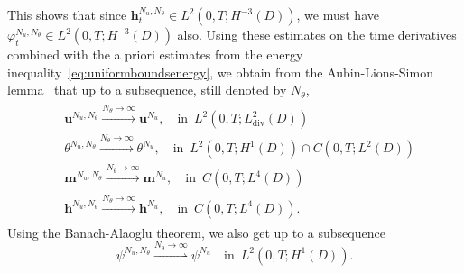 \documentclass[10pt,letterpaper,twoside]{amsart}
\theoremstyle{definition}{\newtheorem{definition}[lemma]{Definition}}
\theoremstyle{note}{\newtheorem{claim}{Claim}[section]
\newtheorem*{claim*}{Claim}}
\numberwithin{equation}{section}
\newcommand{\dom}{D}
\newcommand{\weak}{\rightharpoonup}
\newcommand{\bu}{\mathbf{u}}
\newcommand{\bm}{\mathbf{m}}
\newcommand{\bhb}{\mathbf{h}^{N_u,N_\theta}}
\newcommand{\phb}{\varphi^{N_u,N_\theta}}
\newcommand{\bh}{\mathbf{h}}
\begin{document}
  This shows that since $\bhb_t\in L^2(0,T;H^{-3}(\dom))$, we must have $\phb_t\in L^2(0,T;H^{-3}(\dom))$ also.
 Using these estimates on the time derivatives combined with the a priori estimates from the energy inequality~\eqref{eq:uniformboundsenergy}, we obtain from the Aubin-Lions-Simon lemma~\cite{Simon1987} that up to a subsequence, still denoted by $N_\theta$,
 \begin{align}
 \label{eq:Nu-conv}
 \begin{aligned}
 	&\bu^{N_u,N_\theta}\stackrel{N_\theta\to\infty}{\longrightarrow} \bu^{N_u},\quad \text{in }\, L^2(0,T;L^2_{\text{div}}(\dom))\\
 	& \theta^{N_u,N_\theta}\stackrel{N_\theta\to\infty}{\longrightarrow} \theta^{N_u},\quad \text{in }\, L^2(0,T;H^1(\dom))\cap C(0,T;L^2(\dom))\\
 		&\bm^{N_u,N_\theta}\stackrel{N_\theta\to\infty}{\longrightarrow} \bm^{N_u},\quad \text{in }\, C(0,T;L^4(\dom))\\
 		&\bh^{N_u,N_\theta}\stackrel{N_\theta\to\infty}{\longrightarrow} \bh^{N_u},\quad \text{in }\, C(0,T;L^4(\dom)).
 \end{aligned}
 \end{align}
 Using the Banach-Alaoglu theorem, we also get up to a subsequence
 \begin{equation*}
 	\psi^{N_u,N_\theta}\stackrel{N_\theta\to\infty}{\weak} \psi^{N_u}\quad \text{in }\, L^2(0,T;H^1(\dom)).
 \end{equation*}
\end{document}

